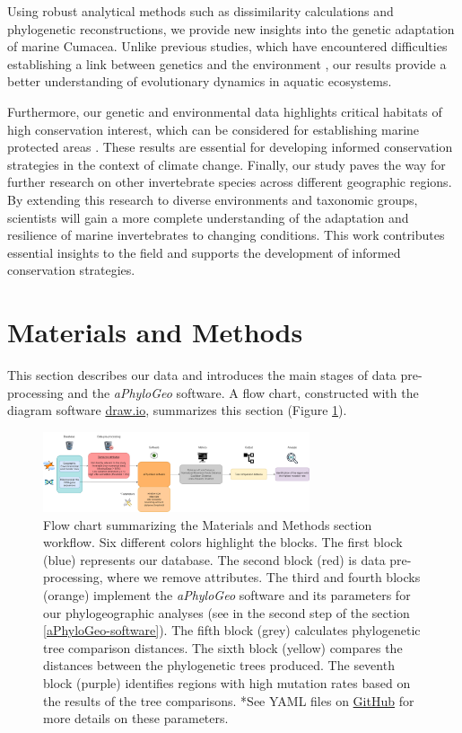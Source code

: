 Using robust analytical methods such as dissimilarity calculations and phylogenetic reconstructions, we provide new insights into the genetic adaptation of marine Cumacea. Unlike previous studies, which have encountered difficulties establishing a link between genetics and the environment \citep{manel2003landscape, balkenhol2009statistical}, our results provide a better understanding of evolutionary dynamics in aquatic ecosystems.

Furthermore, our genetic and environmental data highlights critical habitats of high conservation interest, which can be considered for establishing marine protected areas \citep{levin2009ecological}. These results are essential for developing informed conservation strategies in the context of climate change. Finally, our study paves the way for further research on other invertebrate species across different geographic regions. By extending this research to diverse environments and taxonomic groups, scientists will gain a more complete understanding of the adaptation and resilience of marine invertebrates to changing conditions. This work contributes essential insights to the field and supports the development of informed conservation strategies.

\section{Materials and Methods}\label{materials-methods}
This section describes our data and introduces the main stages of data pre-processing and the \textit{aPhyloGeo} software. A flow chart, constructed with the diagram software \href{https://app.diagrams.net/}{draw.io}, summarizes this section (Figure \ref{fig:fig1}).

\begin{figure}[htbp]
    \centering
    \includegraphics[width=0.7\textwidth]{diagram.drawio.png}
    \caption{Flow chart summarizing the Materials and Methods section workflow. Six different colors highlight the blocks. The first block (blue) represents our database. The second block (red) is data pre-processing, where we remove attributes. The third and fourth blocks (orange) implement the \textit{aPhyloGeo} software and its parameters for our phylogeographic analyses (see in the second step of the section \autoref{aPhyloGeo-software}). The fifth block (grey) calculates phylogenetic tree comparison distances. The sixth block (yellow) compares the distances between the phylogenetic trees produced. The seventh block (purple) identifies regions with high mutation rates based on the results of the tree comparisons. *See YAML files on \href{https://github.com/tahiri-lab/aPhyloGeo}{GitHub} for more details on these parameters. \label{fig:fig1}}
\end{figure}


